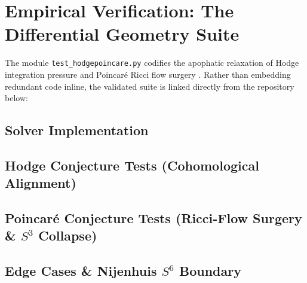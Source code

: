 \documentclass[11pt,a4paper]{article}
\begin{document}
\section{Empirical Verification: The Differential Geometry Suite}
The module \texttt{test\_hodgepoincare.py} codifies the apophatic relaxation of Hodge integration pressure and Poincaré Ricci flow surgery \cite{apophatic_engine_pypi, apophatic_opt_pypi}. Rather than embedding redundant code inline, the validated suite is linked directly from the repository below:

\subsection{Solver Implementation}
\begin{figure}[H]
\centering
\begin{minipage}{0.95\textwidth}

\end{minipage}
\end{figure}

\subsection{Hodge Conjecture Tests (Cohomological Alignment)}
\begin{figure}[H]
\centering
\begin{minipage}{0.95\textwidth}

\end{minipage}
\end{figure}

\subsection{Poincar\'e Conjecture Tests (Ricci-Flow Surgery \& \texorpdfstring{$S^3$}{S³} Collapse)}
\begin{figure}[H]
\centering
\begin{minipage}{0.95\textwidth}

\end{minipage}
\end{figure}

\subsection{Edge Cases \& Nijenhuis \texorpdfstring{$S^6$}{S⁶} Boundary}
\begin{figure}[H]
\centering
\begin{minipage}{0.95\textwidth}

\end{minipage}
\end{figure}
\end{document}
